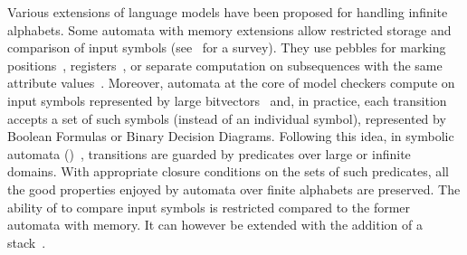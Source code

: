 %
%
Various extensions of language models have been proposed for handling infinite alphabets.
Some automata 
with memory extensions
allow restricted storage and comparison of input symbols
(see~\cite{Segoufin06csl} for a survey).
They use pebbles for marking positions~\cite{NevenSchwentickVianu04FSMinfinite},
registers~\cite{KaminskiFrancez94},
or %
separate computation on subsequences
with the same attribute values~\cite{Bojanczyk11FO2}. %
%
%
Moreover, automata at the core of model checkers
compute on input symbols represented by large bitvectors~\cite{Vardi07ciaa} %
and, in practice,  %
each transition accepts a set of such symbols (instead of an individual symbol),
represented by Boolean Formulas or Binary Decision Diagrams.
%
Following this idea, %
in symbolic automata (\SA)~\cite{Veanes12symbolic,dAntoniVeanes17CAV,dAntoni21CACM},
transitions are guarded by predicates over large or infinite domains.
With appropriate closure conditions on the sets of such predicates, %
all the good properties enjoyed by automata over finite alphabets are preserved.
The ability of \SA to compare input symbols is restricted compared to the 
former automata with memory. 
It can however be extended with the addition of a stack~\cite{dAntonyAlur14SVPDA}.

